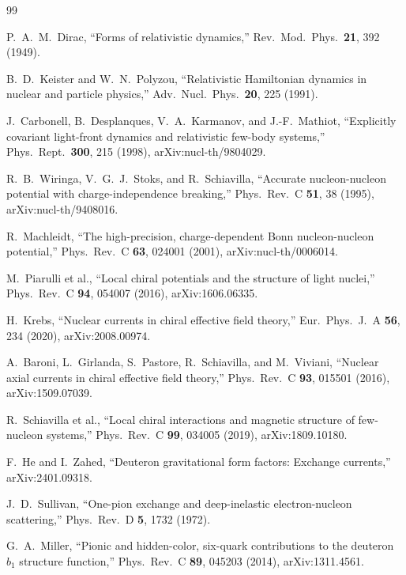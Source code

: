 \documentclass[11pt]{article}
\begin{document}
\small
\begin{thebibliography}{99}

P.~A.~M.~Dirac,
``Forms of relativistic dynamics,''
Rev.\ Mod.\ Phys.\ \textbf{21}, 392 (1949).

B.~D.~Keister and W.~N.~Polyzou,
``Relativistic Hamiltonian dynamics in nuclear and particle physics,''
Adv.\ Nucl.\ Phys.\ \textbf{20}, 225 (1991).

J.~Carbonell, B.~Desplanques, V.~A.~Karmanov, and J.-F.~Mathiot,
``Explicitly covariant light-front dynamics and relativistic few-body systems,''
Phys.\ Rept.\ \textbf{300}, 215 (1998), arXiv:nucl-th/9804029.

R.~B.~Wiringa, V.~G.~J.~Stoks, and R.~Schiavilla,
``Accurate nucleon-nucleon potential with charge-independence breaking,''
Phys.\ Rev.\ C \textbf{51}, 38 (1995), arXiv:nucl-th/9408016.

R.~Machleidt,
``The high-precision, charge-dependent Bonn nucleon-nucleon potential,''
Phys.\ Rev.\ C \textbf{63}, 024001 (2001), arXiv:nucl-th/0006014.

M.~Piarulli et al.,
``Local chiral potentials and the structure of light nuclei,''
Phys.\ Rev.\ C \textbf{94}, 054007 (2016), arXiv:1606.06335.

H.~Krebs,
``Nuclear currents in chiral effective field theory,''
Eur.\ Phys.\ J.\ A \textbf{56}, 234 (2020), arXiv:2008.00974.

A.~Baroni, L.~Girlanda, S.~Pastore, R.~Schiavilla, and M.~Viviani,
``Nuclear axial currents in chiral effective field theory,''
Phys.\ Rev.\ C \textbf{93}, 015501 (2016), arXiv:1509.07039.

R.~Schiavilla et al.,
``Local chiral interactions and magnetic structure of few-nucleon systems,''
Phys.\ Rev.\ C \textbf{99}, 034005 (2019), arXiv:1809.10180.

F.~He and I.~Zahed,
``Deuteron gravitational form factors: Exchange currents,''
arXiv:2401.09318.

J.~D.~Sullivan,
``One-pion exchange and deep-inelastic electron-nucleon scattering,''
Phys.\ Rev.\ D \textbf{5}, 1732 (1972).

G.~A.~Miller,
``Pionic and hidden-color, six-quark contributions to the deuteron \(b_1\)
structure function,''
Phys.\ Rev.\ C \textbf{89}, 045203 (2014), arXiv:1311.4561.


\end{thebibliography}
\end{document}
